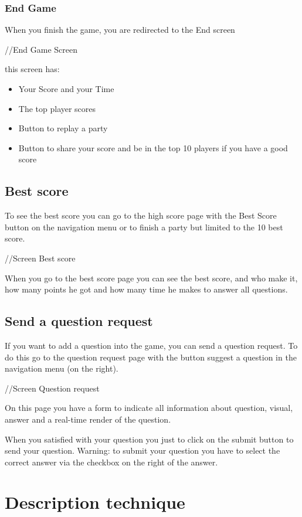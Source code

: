 \documentclass[a4paper,11pt, oneside]{book}
\begin{document}
\subsection{End Game}
	When you finish the game, you are redirected to the End screen

//End Game Screen

this screen has:
\begin{itemize}
\item Your Score and your Time
\item The top player scores
\item Button to replay a party
\item Button to share your score and be in the top 10 players if you have a good score
\end{itemize}

\section{Best score}
To see the best score you can go to the high score page with the Best Score button on the navigation menu or to finish a party but limited to the 10 best score.

//Screen Best score

When you go to the best score page you can see the best score, and who make it, how many points he got and how many time he makes to answer all questions.

\section{Send a question request}
If you want to add a question into the game, you can send a question request.
To do this go to the question request page with the button suggest a question in the navigation menu (on the right).

//Screen Question request

On this page you have a form to indicate all information about question, visual, answer and a real-time render of the question.

When you satisfied with your question you just to click on the submit button to send your question.
Warning: to submit your question you have to select the correct answer via the checkbox on the right of the answer.

\newpage	
\chapter{Description technique}
\end{document}
